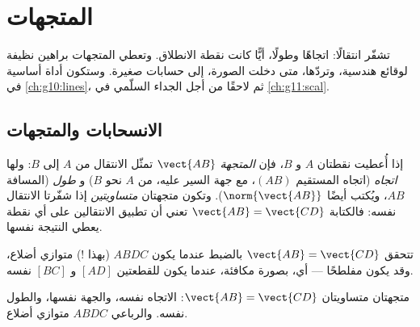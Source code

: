 \chapter{المتجهات}\label{ch:g10:vectors}

تشفّر  انتقالًا: اتجاهًا وطولًا، أيًّا كانت
نقطة الانطلاق. وتعطي المتجهات براهين نظيفة لوقائع هندسية، وتردّها،
متى دخلت  الصورة، إلى حسابات صغيرة. وستكون أداة أساسية
في \cref{ch:g10:lines}، ثم لاحقًا من أجل الجداء السلّمي
في \cref{ch:g11:scal}.

\section{الانسحابات والمتجهات}

\begin{definition}[المتجهة]\label{def:g10:vectors:vector}
إذا أُعطيت نقطتان $A$ و $B$، فإن \emph{المتجهة} $\vect{AB}$
تمثّل الانتقال من $A$ إلى $B$: ولها
\emph{اتجاه} (اتجاه المستقيم $(AB)$، مع جهة السير
عليه، من $A$ نحو $B$) و
\emph{طول} (المسافة $AB$، ويُكتب أيضًا $\norm{\vect{AB}}$).
وتكون متجهتان \emph{متساويتين} إذا شفّرتا الانتقال نفسه:
فالكتابة $\vect{AB} = \vect{CD}$ تعني أن تطبيق الانتقالين على أي
نقطة يعطي النتيجة نفسها.
\end{definition}

\begin{proposition}\label{prop:g10:vectors:parallelogram}
تتحقق $\vect{AB} = \vect{CD}$ بالضبط عندما يكون $ABDC$ (بهذا !)
متوازي أضلاع، وقد يكون مفلطحًا --- أي، بصورة مكافئة، عندما يكون للقطعتين $[AD]$
و $[BC]$  نفسه.
\end{proposition}
\admitted

\begin{omfigure}

{\small متجهتان متساويتان $\vect{AB} = \vect{CD}$: الاتجاه نفسه، والجهة نفسها،
والطول نفسه. والرباعي $ABDC$ متوازي أضلاع.}
\end{omfigure}

